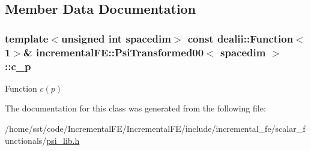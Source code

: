 \subsection{Member Data Documentation}
\subsubsection[{\texorpdfstring{c\+\_\+p}{c_p}}]{\setlength{\rightskip}{0pt plus 5cm}template$<$unsigned int spacedim$>$ const dealii\+::\+Function$<$1$>$\& {\bf incremental\+F\+E\+::\+Psi\+Transformed00}$<$ spacedim $>$\+::c\+\_\+p\hspace{0.3cm}{\ttfamily [private]}}\hypertarget{classincremental_f_e_1_1_psi_transformed00_ac2839f6d588883ce362c51146d427671}{}\label{classincremental_f_e_1_1_psi_transformed00_ac2839f6d588883ce362c51146d427671}
Function $c(p)$ 

The documentation for this class was generated from the following file\+:\begin{DoxyCompactItemize}
\item 
/home/sst/code/\+Incremental\+F\+E/\+Incremental\+F\+E/include/incremental\+\_\+fe/scalar\+\_\+functionals/\hyperlink{psi__lib_8h}{psi\+\_\+lib.\+h}\end{DoxyCompactItemize}
